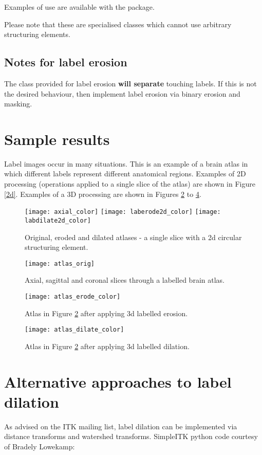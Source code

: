 \documentclass{InsightArticle}
\begin{document}
Examples of use are available with the package.

Please note that these are specialised classes which cannot use
arbitrary structuring elements.
\subsection{Notes for label erosion}
The class provided for label erosion {\bf will separate} touching
labels. If this is not the desired behaviour, then implement label
erosion via binary erosion and masking.

\section{Sample results}
Label images occur in many situations. This is an example of a brain
atlas in which different labels represent different anatomical
regions. Examples of 2D processing (operations applied to a single slice of the atlas) are shown in Figure \ref{2d}. Examples of a 3D processing are shown in Figures \ref{fig:3dorig} to \ref{fig:3ddil}.

\begin{figure}[htbp]
\centering
\texttt{[image: axial\_color]}
\texttt{[image: laberode2d\_color]}
\texttt{[image: labdilate2d\_color]}
\caption{Original, eroded and dilated atlases - a single slice with a 2d circular structuring element.\label{fig:2d}}
\end{figure}

\begin{figure}[htbp]
\centering
\texttt{[image: atlas\_orig]}
\caption{Axial, sagittal and coronal slices through a labelled brain atlas.\label{fig:3dorig}}
\end{figure}

\begin{figure}[htbp]
\centering
\texttt{[image: atlas\_erode\_color]}
\caption{Atlas in Figure \ref{fig:3dorig} after applying 3d labelled erosion. \label{fig:3dero}}
\end{figure}

\begin{figure}[htbp]
\centering
\texttt{[image: atlas\_dilate\_color]}
\caption{Atlas in Figure \ref{fig:3dorig} after applying 3d labelled dilation. \label{fig:3ddil}}
\end{figure}


\section{Alternative approaches to label dilation}
As advised on the ITK mailing list, label dilation can be implemented
via distance transforms and watershed transforms. SimpleITK python code courtesy of Bradely Lowekamp:
\end{document}
